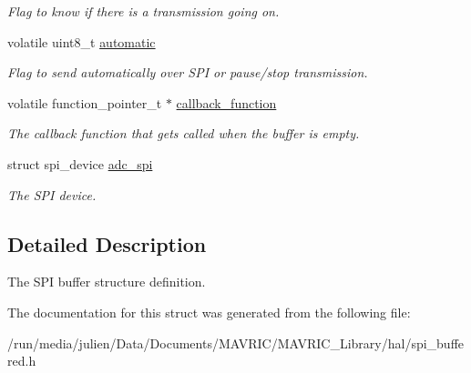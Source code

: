 \begin{DoxyCompactItemize}
\begin{DoxyCompactList}\small\item\em Flag to know if there is a transmission going on. \end{DoxyCompactList}\item 
\hypertarget{structspi__buffer__t_ab6d23cf4c92a75954f6f8d7690cb78d3}{volatile uint8\+\_\+t \hyperlink{structspi__buffer__t_ab6d23cf4c92a75954f6f8d7690cb78d3}{automatic}}\label{structspi__buffer__t_ab6d23cf4c92a75954f6f8d7690cb78d3}

\begin{DoxyCompactList}\small\item\em Flag to send automatically over S\+P\+I or pause/stop transmission. \end{DoxyCompactList}\item 
\hypertarget{structspi__buffer__t_ae1d0fd5fdbbe965b3be709c512d13c7b}{volatile function\+\_\+pointer\+\_\+t $\ast$ \hyperlink{structspi__buffer__t_ae1d0fd5fdbbe965b3be709c512d13c7b}{callback\+\_\+function}}\label{structspi__buffer__t_ae1d0fd5fdbbe965b3be709c512d13c7b}

\begin{DoxyCompactList}\small\item\em The callback function that gets called when the buffer is empty. \end{DoxyCompactList}\item 
\hypertarget{structspi__buffer__t_a3e5a7e5a671a530d00631c13af9bfd10}{struct spi\+\_\+device \hyperlink{structspi__buffer__t_a3e5a7e5a671a530d00631c13af9bfd10}{adc\+\_\+spi}}\label{structspi__buffer__t_a3e5a7e5a671a530d00631c13af9bfd10}

\begin{DoxyCompactList}\small\item\em The S\+P\+I device. \end{DoxyCompactList}\end{DoxyCompactItemize}


\subsection{Detailed Description}
The S\+P\+I buffer structure definition. 

The documentation for this struct was generated from the following file\+:\begin{DoxyCompactItemize}
\item 
/run/media/julien/\+Data/\+Documents/\+M\+A\+V\+R\+I\+C/\+M\+A\+V\+R\+I\+C\+\_\+\+Library/hal/spi\+\_\+buffered.\+h\end{DoxyCompactItemize}

